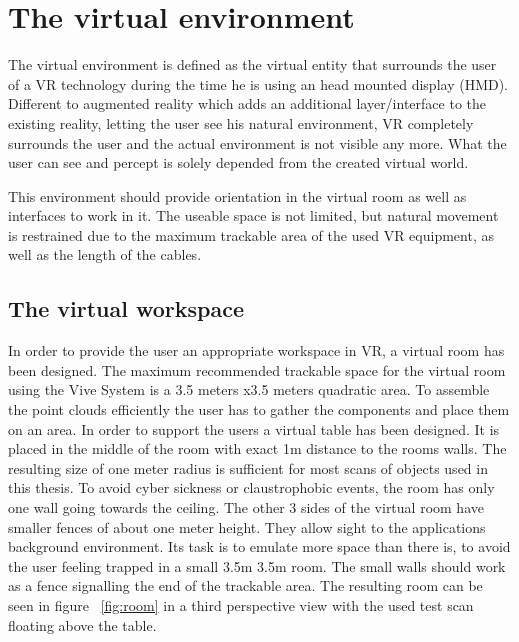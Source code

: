 \documentclass[hyperref,english,bachelorofscience,bibnum,twoside]{cgvpub}
\begin{document}
\section{The virtual environment}

The virtual environment is defined as the virtual entity that surrounds the user of a VR technology during the time he is using an head mounted display (HMD). Different to augmented reality which adds an additional layer/interface to the existing reality, letting the user see his natural environment, VR completely surrounds the user and the actual environment is not visible any more. What the user can see and percept is solely depended from the created virtual world\cite{Milgram1995}.

This environment should provide orientation in the virtual room as well as interfaces to work in it. The useable space is not limited, but natural movement is restrained due to the maximum trackable area of the used VR equipment, as well as the length of the cables. 

\subsection{The virtual workspace}

In order to provide the user an appropriate workspace in VR, a virtual room has been designed. The maximum recommended trackable space for the virtual room using the Vive System is a 3.5 meters x3.5 meters quadratic area.\cite{vivehelp}
To assemble the point clouds efficiently the user has to gather the components and place them on an area. In order to support the users a virtual table has been designed. It is placed in the middle of the room with exact 1m distance to the rooms walls. The resulting size of one meter radius is sufficient for most scans of objects used in this thesis.
To avoid cyber sickness or claustrophobic events, the room has only one wall going towards the ceiling. The other 3 sides of the virtual room have smaller fences of about one meter height. They allow sight to the applications background environment. Its task is to emulate more space than there is, to avoid the user feeling trapped in a small 3.5m 3.5m room. The small walls should work as a fence signalling the end of the trackable area. The resulting room can be seen in figure ~\ref{fig:room} in a third perspective view with the used test scan floating above the table.
\end{document}
